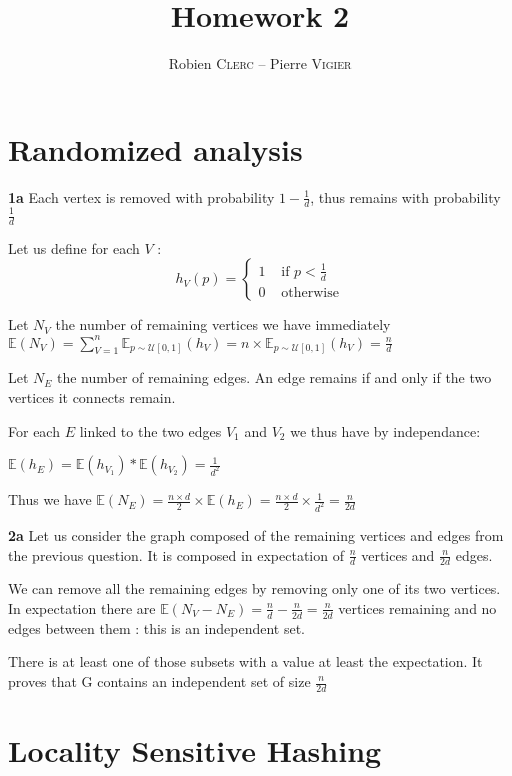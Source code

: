 \documentclass[10pt,a4paper]{article}
\title{Homework 2}
\author{Robien \textsc{Clerc} -- Pierre \textsc{Vigier}}
\theoremstyle{plain}
\begin{document}
\maketitle

\section{Randomized analysis}

\textbf{1a} Each vertex is removed with probability $1 - \frac{1}{d}$, thus remains with probability $\frac{1}{d}$

Let us define for each $V$ :
$$
h_{V}(p) = \left\{\begin{array}{ll}
1 & \text{ if } p < \frac{1}{d} \\
0 & \text{ otherwise}
\end{array}\right.
$$

Let $N_V$ the number of remaining vertices we have immediately $\mathbb{E}(N_V) = \sum_{V=1}^{n} {\mathbb{E}_{p \sim \mathcal{U}[0, 1]}(h_{V})} = n \times {\mathbb{E}_{p \sim \mathcal{U}[0, 1]}(h_{V})} = \frac{n}{d}$

Let $N_E$ the number of remaining edges. An edge remains if and only if the two vertices it connects remain.

For each $E$ linked to the two edges $V_1$ and $V_2$ we thus have by independance: 

$\mathbb{E}(h_E) = \mathbb{E}(h_{V_1}) * \mathbb{E}(h_{V_2}) =\frac{1}{d^2} $

Thus we have $\mathbb{E}(N_E) = \frac{n \times d}{2} \times \mathbb{E}(h_E) =\frac{n \times d}{2} \times \frac{1}{d^2} =  \frac{n}{2d}$

\textbf{2a} Let us consider the graph composed of the remaining vertices and edges from the previous question. It is composed in expectation of $\frac{n}{d}$ vertices and $\frac{n}{2d}$ edges.

We can remove all the remaining edges by removing only one of its two vertices. In expectation there are $\mathbb{E}(N_V - N_E) = \frac{n}{d} - \frac{n}{2d} = \frac{n}{2d}$ vertices remaining and no edges between them : this is an independent set.

There is at least one of those subsets with a value at least the expectation. It proves that G contains an independent set of size $\frac{n}{2d}$

\section{Locality Sensitive Hashing}
\end{document}
